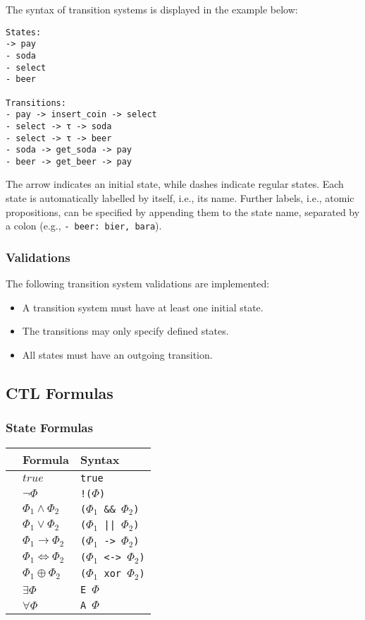 \documentclass[11pt]{article}
\begin{document}
The syntax of transition systems is displayed in the example below:

\begin{lstlisting}
States:
-> pay
- soda
- select
- beer

Transitions:
- pay -> insert_coin -> select
- select -> τ -> soda
- select -> τ -> beer
- soda -> get_soda -> pay
- beer -> get_beer -> pay
\end{lstlisting}


The arrow indicates an initial state, while dashes indicate regular states.
Each state is automatically labelled by itself, i.e., its name.
Further labels, i.e., atomic propositions, can be specified by appending them to the state name, separated by a colon (e.g., \verb|- beer: bier, bara|).

\subsubsection{Validations}

The following transition system validations are implemented:

\begin{itemize}
  \item A transition system must have at least one initial state.
  \item The transitions may only specify defined states.
  \item All states must have an outgoing transition.
\end{itemize}

\subsection{CTL Formulas}

\subsubsection{State Formulas}

\begin{tabular}{l|ll}
  & Formula & Syntax \\
  \hline
  & $true$ & \verb|true| \\
  & $\neg\Phi$ & \verb|!(|$\Phi$\verb|)| \\
  & $\Phi_1 \wedge \Phi_2$ & \verb|(|$\Phi_1$\verb| && |$\Phi_2$\verb|)| \\
  & $\Phi_1 \vee \Phi_2$ & \verb|(|$\Phi_1$\verb[ || [$\Phi_2$\verb|)| \\
  & $\Phi_1 \rightarrow \Phi_2$ & \verb|(|$\Phi_1$\verb| -> |$\Phi_2$\verb|)| \\
  & $\Phi_1 \iff \Phi_2$ & \verb|(|$\Phi_1$\verb| <-> |$\Phi_2$\verb|)| \\
  & $\Phi_1 \oplus \Phi_2$ & \verb|(|$\Phi_1$\verb| xor |$\Phi_2$\verb|)| \\
  & $\exists \Phi$ & \verb|E |$\Phi$\verb|| \\
  & $\forall \Phi$ & \verb|A |$\Phi$\verb|| \\
\end{tabular}
\end{document}
